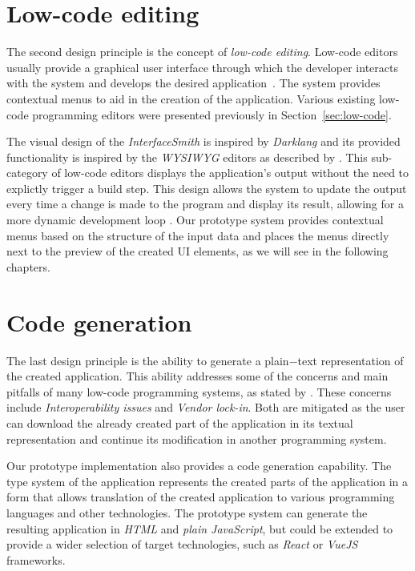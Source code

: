 \section{Low-code editing}

The second design principle is the concept of \emph{low-code editing}.
Low-code editors usually provide a graphical user interface through which the developer interacts with the system and develops the desired application~\cite{Pinho_Aguiar_Amaral_2023, Sahay_Indamutsa_Di}.
The system provides contextual menus to aid in the creation of the application.
Various existing low-code programming editors were presented previously in Section~\ref{sec:low-code}.

The visual design of the \emph{InterfaceSmith} is inspired by \emph{Darklang} and its provided functionality is inspired by the \emph{WYSIWYG} editors as described by \citet{Yang_Gupta_Botev_Churchill_Levchenko_Shanmugasundaram_2008}.
This sub-category of low-code editors displays the application's output without the need to explictly trigger a build step.
This design allows the system to update the output every time a change is made to the program and display its result, allowing for a more dynamic development loop \cite{output-directed-programming}.
Our prototype system provides contextual menus based on the structure of the input data and places the menus directly next to the preview of the created UI elements, as we will see in the following chapters.

\section{Code generation}

The last design principle is the ability to generate a plain−text representation of the created application.
This ability addresses some of the concerns and main pitfalls of many low-code programming systems, as stated by \citet{Pinho_Aguiar_Amaral_2023}.
These concerns include \emph{Interoperability issues} and \emph{Vendor lock-in}.
Both are mitigated as the user can download the already created part of the application in its textual representation and continue its modification in another programming system.

Our prototype implementation also provides a code generation capability.
The type system of the application represents the created parts of the application in a form that allows translation of the created application to various programming languages and other technologies.
The prototype system can generate the resulting application in \emph{HTML} and \emph{plain JavaScript}, but could be extended to provide a wider selection of target technologies,
such as \emph{React} or \emph{VueJS} frameworks.
